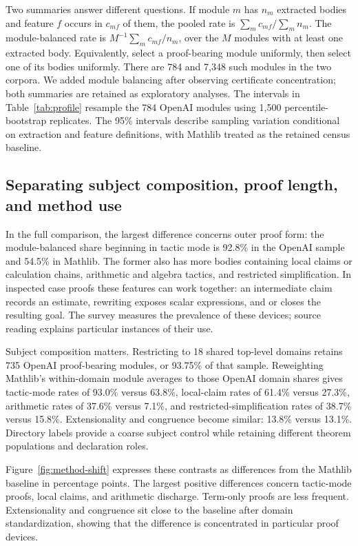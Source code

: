 Two summaries answer different questions. If module $m$ has $n_m$
extracted bodies and feature $f$ occurs in $c_{mf}$ of them, the pooled
rate is $\sum_m c_{mf}/\sum_m n_m$. The module-balanced rate is
$M^{-1}\sum_m c_{mf}/n_m$, over the $M$ modules with at least one
extracted body. Equivalently, select a proof-bearing module uniformly,
then select one of its bodies uniformly. There are 784 and 7,348 such
modules in the two corpora. We added module balancing after observing
certificate concentration; both summaries are retained as exploratory
analyses. The intervals in Table~\ref{tab:profile} resample the 784 OpenAI
modules using 1,500 percentile-bootstrap replicates. The 95\% intervals describe
sampling variation conditional on extraction and feature definitions,
with Mathlib treated as the retained census baseline.



\subsection{Separating subject composition, proof length, and method use}

In the full comparison, the largest difference concerns outer proof form:
the module-balanced share beginning in tactic mode is 92.8\% in the
OpenAI sample and 54.5\% in Mathlib. The former also has more bodies
containing local claims or calculation chains, arithmetic and algebra
tactics, and restricted simplification. In inspected case proofs these
features can work together: an intermediate claim records an estimate,
rewriting exposes scalar expressions, and  or 
closes the resulting goal. The survey measures the prevalence of these
devices; source reading explains particular instances of their use.

Subject composition matters. Restricting to 18 shared top-level domains
retains 735 OpenAI proof-bearing modules, or 93.75\% of that sample.
Reweighting Mathlib's within-domain module averages to those OpenAI
domain shares gives tactic-mode rates of 93.0\% versus 63.8\%, local-claim
rates of 61.4\% versus 27.3\%, arithmetic rates of 37.6\% versus 7.1\%,
and restricted-simplification rates of 38.7\% versus 15.8\%.
Extensionality and congruence become similar: 13.8\% versus 13.1\%.
Directory labels provide a coarse subject control while retaining
different theorem populations and declaration roles.

Figure~\ref{fig:method-shift} expresses these contrasts as differences
from the Mathlib baseline in percentage points. The largest positive
differences concern tactic-mode proofs, local claims, and arithmetic
discharge. Term-only proofs are less frequent. Extensionality and
congruence sit close to the baseline after domain standardization,
showing that the difference is concentrated in particular proof devices.

